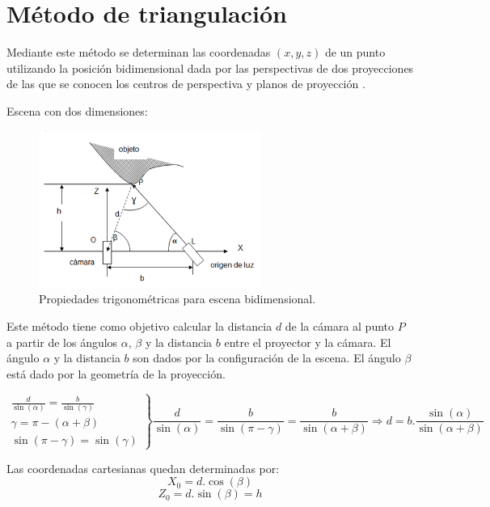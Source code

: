 ﻿\chapter{Método de triangulación}

Mediante este método se determinan las coordenadas $(x,y,z)$ de un punto utilizando la posición bidimensional dada por las perspectivas de dos proyecciones de las que se conocen los centros de perspectiva y planos de proyección \cite{PresUnivYonsei}.

Escena con dos dimensiones:

\begin{figure}[H]
  \centering
    \includegraphics[width=0.65\textwidth]{./Cap2_videomapping/triangulacion.PNG}
  \caption{Propiedades trigonométricas para escena bidimensional.}%
  \label{fig:Triangulacion}
\end{figure}

Este método tiene como objetivo calcular la distancia $d$ de la cámara al punto $P$ a partir de los ángulos $\alpha$, $\beta$ y la distancia $b$ entre el proyector y la cámara.
El ángulo $\alpha$ y la distancia $b$ son dados por la configuración de la escena.
El ángulo $\beta$ está dado por la geometría de la proyección.

\[
\left.
\begin{array}{l}
\frac{d}{\sin (\alpha)} = \frac{b}{\sin (\gamma)} 	\\
\gamma = \pi - (\alpha + \beta)						\\
\sin (\pi - \gamma) = \sin (\gamma)
\end{array}
\right \rbrace
\frac{d}{\sin(\alpha)} = \frac{b}{\sin(\pi - \gamma)} = \frac{b}{\sin(\alpha + \beta)} \Rightarrow d = b . \frac{\sin(\alpha)}{\sin(\alpha + \beta)}
\]

Las coordenadas cartesianas quedan determinadas por:
\[
X_0 = d. \cos (\beta)
\]
\[
Z_0 = d. \sin (\beta) = h
\]

